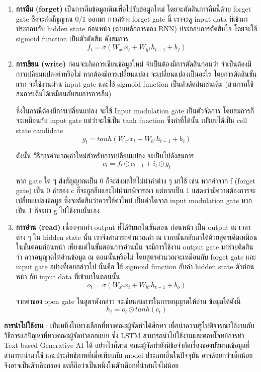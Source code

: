 \begin{enumerate}
      \item \textbf{การลืม (forget)} เป็นการลืมข้อมูลเดิมเพื่อไปรับข้อมูลใหม่
            โดยจะตัดสินการลืมนี้ด้วย forget gate ซึ่งจะส่งสัญญาณ 0/1 ออกมา การสร้าง
            forget gate นี้ เราจะดู input data ที่เข้ามา ประกอบกับ hidden state
            ก่อนหน้า (ตามหลักการของ RNN) ประกอบการตัดสินใจ โดยจะใช้
            sigmoid function เป็นตัวตัดสิน ดังสมการ
            \[f_t = \sigma(W_{x^f}x_t + W_{h^f}h_{t-1}+b_f) \]
      \item \textbf{การเขียน (write)} ก่อนจะเกิดการเขียนข้อมูลใหม่
            จำเป็นต้องมีการตัดสินก่อนว่า จำเป็นต้องมีการเปลี่ยนแปลงค่าหรือไม่
            หากต้องมีการเปลี่ยนแปลง จะเปลี่ยนแปลงเป็นอะไร โดยการตัดสินขั้นแรก
            จะใช้งานผ่าน input gate และใช้ sigmoid function เป็นตัวตัดสินเช่นเดิม
            (สามารถใช้สมการเดิมได้เหมือนกับสมการการลืม)
            \par ซึ่งในกรณีต้องมีการเปลี่ยนแปลง จะใช้ Input modulation gate
            เป็นตัวจัดการ โดยสมการก็จะเหมือนกับ input gate แต่ว่าจะใช้เป็น
            tanh function ซึ่งค่าที่ได้นั้น เปรียบได้เป็น cell state candidate
            \[ g_t = tanh(W_{x^c}x_t + W_{h^c}h_{t-1}+b_c) \]
            \par ดังนั้น วิธีการคำนวณค่าใหม่สำหรับการเปลี่ยนแปลง จะเป็นไปดังสมการ
            \[c_t = f_t \odot c_{t-1}+i_t \odot g_t \]
            \par หาก gate ใด ๆ ส่งสัญญาณเป็น 0 ก็จะส่งผลให้ไม่นำค่าต่าง ๆ มาใช้ เช่น
            หากค่าจาก f (forget gate) เป็น 0 ค่าของ c ก็จะถูกลืมและไม่นำมาพิจารณา
            แต่หากเป็น 1 แสดงว่ามีความต้องการจะเปลี่ยนแปลงข้อมูล ซึ่งจะตัดสินว่าควรใช้ค่าใหม่
            เป็นค่าใดจาก input modulation gate หากเป็น 1 ก็จะนำ g ไปใช้งานนั่นเอง
      \item \textbf{การอ่าน (read)} เนื่องจากค่า output ที่ได้รับมาในขั้นตอน
            ก่อนหน้า เป็น output ณ เวลาต่าง ๆ ใน hidden state นั้น
            เราจึงสามารถคำนวณค่า ณ เวลานั้นกลับมาได้ด้วยสูตรเดิมเหมือนในขั้นตอนก่อนหน้า
            เพียงแต่ในขั้นตอนการอ่านนั้น จะมีการใช้งาน output gate มาช่วยติดสินว่า
            ควรอนุญาตให้อ่านข้อมูล ณ ตอนนั้นหรือไม่ โดยสูตรคำนวณจะเหมือนกับ
            forget gate และ input gate อย่างที่เคยกล่าวไป นั่นคือ ใช้
            sigmoid function กับค่า hidden state ตัวก่อนหน้า กับ input data
            ที่เข้ามาในตอนนั้น
            \[ o_t = \sigma (W_{x^o}x_t+W_{h^o}h_{t-1}+b_o) \]
            \par จากค่าของ open gate ในสูตรดังกล่าว จะเขียนสมการในการอนุญาตให้อ่าน
            ข้อมูลได้ดังนี้
            \[ h_t = o_t \odot tanh(c_t) \]
\end{enumerate}
\textbf{การนำไปใช้งาน} : เป็นหนึ่งในทางเลือกที่ทางคณะผู้จัดทำได้ศึกษา
เพื่อนำความรู้ไปพิจารณาใช้งานกับวิธีการแก้ปัญหาที่ทางคณะผู้จัดทำออกแบบ ซึ่ง LSTM
สามารถนำไปใช้งานและตอบโจทย์การทำ Text-based Generative AI ได้
อย่างไรก็ตาม คณะผู้จัดทำยังมีข้อจำกัดเรื่องของปริมาณข้อมูลที่สามารถนำมาใช้
และประสิทธิภาพที่เมื่อเทียบกับ model ประเภทอื่นในปัจจุบัน อาจด้อยกว่าเล็กน้อย
จึงอาจเป็นตัวเลือกรอง แต่ก็ถือว่าเป็นหนึ่งในตัวเลือกที่น่าสนใจไม่น้อย

